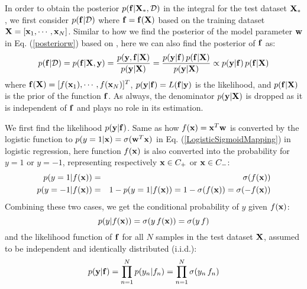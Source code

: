 \documentclass{article}
\begin{document}
In order to obtain the posterior $p({\bf f}|{\bf X}_*,{\cal D})$ 
in the integral for the test dataset ${\bf X}_*$, we first consider 
$p({\bf f}|{\cal D})$ where ${\bf f}={\bf f}({\bf X})$ based on the
training dataset ${\bf X}=[{\bf x}_1,\cdots,{\bf x}_N]$. Similar to 
how we find the posterior of the model parameter ${\bf w}$ in 
Eq. (\ref{posteriorw}) based on 
,
here we can also find the posterior of ${\bf f}$ as:
\begin{equation}
  p({\bf f}|{\cal D})=p({\bf f}|{\bf X},{\bf y})
  =\frac{p({\bf y},{\bf f}|{\bf X})}{p({\bf y}|{\bf X})}
  =\frac{p({\bf y}|{\bf f})\,p({\bf f}|{\bf X})}{p({\bf y}|{\bf X})}
  \propto p({\bf y}|{\bf f})\,p({\bf f}|{\bf X})
  \label{PosteriorBayesGaussian}
\end{equation}
where ${\bf f}({\bf X})=[f({\bf x}_1),\cdots,f({\bf x}_N)]^T$,
$p({\bf y}|{\bf f})=L({\bf f}|{\bf y})$ is the likelihood, and
$p({\bf f}|{\bf X})$ is the prior of the function ${\bf f}$. As 
always, the denominator $p({\bf y}|{\bf X})$ is dropped as it is 
independent of ${\bf f}$ and plays no role in its estimation. 

We first find the likelihood $p({\bf y}|{\bf f})$. Same as
how $f({\bf x})={\bf x}^T{\bf w}$ is converted by the logistic 
function to $p(y=1|{\bf x})=\sigma({\bf w}^T{\bf x})$ in 
Eq. (\ref{LogisticSigmoidMapping}) in logistic regression, here 
function $f({\bf x})$ is also converted into the probability for
$y=1$ or $y=-1$, representing respectively ${\bf x}\in C_+$ or 
${\bf x}\in C_-$:
\begin{eqnarray}
  p(y=1| f({\bf x}) )&=&\sigma(f({\bf x}))
  \nonumber\\
  p(y=-1| f({\bf x}) )&=&1-p(y=1| f({\bf x}) )
  =1-\sigma(f({\bf x})) =\sigma(-f({\bf x}))
\end{eqnarray}
Combining these two cases, we get the conditional probability 
of $y$ given $f({\bf x})$:
\begin{equation}
  p(y|f({\bf x}))=\sigma(y\,f({\bf x}) )=\sigma(y\,f)
\end{equation}
and the likelihood function of ${\bf f}$ for all $N$ samples 
in the test dataset ${\bf X}$, assumed to be independent and 
identically distributed (i.i.d.):
\begin{equation}
  p({\bf y}|{\bf f})=\prod_{n=1}^N p(y_n|f_n)
  =\prod_{n=1}^N \sigma(y_n\,f_n)
\end{equation}
\end{document}
